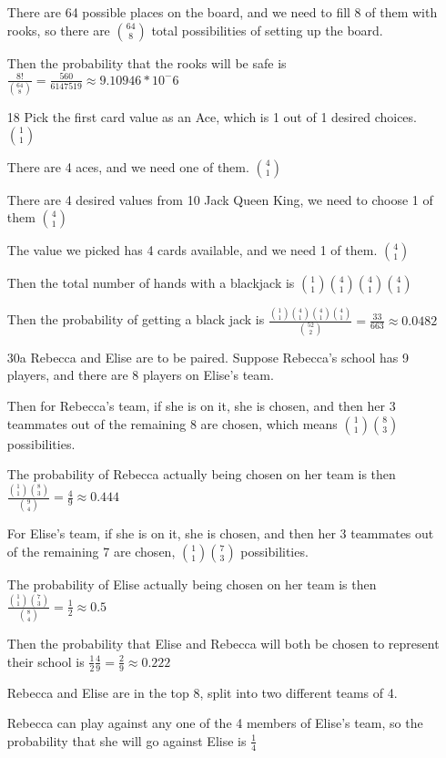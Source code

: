 \documentclass[11pt]{article}
\begin{document}
\begin{itemize}
  There are 64 possible places on the board, and we need to fill 8 of them with rooks, so there are $\binom{64}{8}$ total possibilities of setting up the board.

  Then the probability that the rooks will be safe is
  $\frac{8!}{\binom{64}{8}} = \frac{560}{6147519} \approx 9.10946*10^-6$
\item[18]
  Pick the first card value as an Ace, which is 1 out of 1 desired choices. $\binom{1}{1}$

  There are 4 aces, and we need one of them. $\binom{4}{1}$

  There are 4 desired values from 10 Jack Queen King, we need to choose 1 of them $\binom{4}{1}$

  The value we picked has 4 cards available, and we need 1 of them. ${\binom{4}{1}}$

  Then the total number of hands with a blackjack is $\binom{1}{1}\binom{4}{1}\binom{4}{1}{\binom{4}{1}}$

  Then the probability of getting a black jack is $\frac{\binom{1}{1}\binom{4}{1}\binom{4}{1}{\binom{4}{1}}}{\binom{52}{2}} = \frac{33}{663} \approx 0.0482$
\item[30a]
  Rebecca and Elise are to be paired. Suppose Rebecca's school has 9 players, and there are 8 players on Elise's team.

  Then for Rebecca's team, if she is on it, she is chosen, and then her 3 teammates out of the remaining 8 are chosen, which means $\binom{1}{1}\binom{8}{3}$ possibilities.

  The probability of Rebecca actually being chosen on her team is then $\frac{\binom{1}{1}\binom{8}{3}}{\binom{9}{4}} = \frac{4}{9} \approx 0.444$

  For Elise's team, if she is on it, she is chosen, and then her 3 teammates out of the remaining 7 are chosen, $\binom{1}{1}\binom{7}{3}$ possibilities.

  The probability of Elise actually being chosen on her team is then $\frac{\binom{1}{1}\binom{7}{3}}{\binom{8}{4}} = \frac{1}{2} \approx 0.5$

  Then the probability that Elise and Rebecca will both be chosen to represent their school is $\frac{1}{2} \frac{4}{9} = \frac{2}{9} \approx 0.222$

  Rebecca and Elise are in the top 8, split into two different teams of 4.

  Rebecca can play against any one of the 4 members of Elise's team, so the probability that she will go against Elise is $\frac{1}{4}$


\end{itemize}
\end{document}
